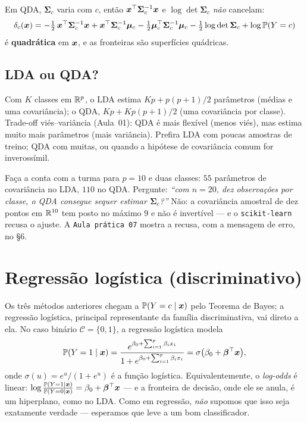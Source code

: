 \documentclass[11pt,a4paper]{article}
\begin{document}
\begin{observacao}
Em QDA, $\bm{\Sigma}_c$ varia com $c$, então $\bm{x}^\top\bm{\Sigma}_c^{-1}\bm{x}$ e
$\log\det\bm{\Sigma}_c$ \emph{não} cancelam:
\[
  \delta_c(\bm{x}) = -\tfrac12\,\bm{x}^\top\bm{\Sigma}_c^{-1}\bm{x}
   + \bm{x}^\top\bm{\Sigma}_c^{-1}\bm{\mu}_c
   - \tfrac12\bm{\mu}_c^\top\bm{\Sigma}_c^{-1}\bm{\mu}_c
   - \tfrac12\log\det\bm{\Sigma}_c + \log\mathbb{P}(Y=c)
\]
é \textbf{quadrática} em $\bm{x}$, e as fronteiras são superfícies quádricas.
\end{observacao}

\subsection{LDA ou QDA?}
Com $K$ classes em $\mathbb{R}^p$, o LDA estima $Kp+p(p+1)/2$ parâmetros (médias e uma
covariância); o QDA, $Kp+Kp(p+1)/2$ (uma covariância por classe). Trade-off
viés--variância (Aula~01): QDA é mais flexível (menos viés), mas estima muito mais
parâmetros (mais variância). Prefira LDA com poucas amostras de treino; QDA com
muitas, ou quando a hipótese de covariância comum for inverossímil.

\begin{emsala}
Faça a conta com a turma para $p=10$ e duas classes: $55$ parâmetros de covariância
no LDA, $110$ no QDA. Pergunte: \emph{``com $n=20$, dez observações por classe, o
QDA consegue sequer estimar $\bm{\Sigma}_c$?''} Não: a covariância amostral de dez
pontos em $\mathbb{R}^{10}$ tem posto no máximo $9$ e não é invertível --- e o
\texttt{scikit-learn} recusa o ajuste. A \texttt{Aula prática 07} mostra a recusa,
com a mensagem de erro, no §6.
\end{emsala}

\section{Regressão logística (discriminativo)}
Os três métodos anteriores chegam a $\mathbb{P}(Y=c\mid\bm{x})$ pelo Teorema de Bayes; a
regressão logística, principal representante da família discriminativa, vai direto a
ela. No caso binário $\mathcal{C}=\{0,1\}$, a regressão logística modela
\begin{equation}\label{eq:logit}
  \mathbb{P}(Y=1\mid\bm{x}) = \frac{e^{\beta_0+\sum_{i=1}^p\beta_i x_i}}
                          {1+e^{\beta_0+\sum_{i=1}^p\beta_i x_i}}
  = \sigma\big(\beta_0+\bm{\beta}^\top\bm{x}\big),
\end{equation}
onde $\sigma(u)=e^u/(1+e^u)$ é a função logística. Equivalentemente, o
\emph{log-odds} é linear: $\log\frac{\mathbb{P}(Y=1\mid\bm{x})}{\mathbb{P}(Y=0\mid\bm{x})}
=\beta_0+\bm{\beta}^\top\bm{x}$ --- e a fronteira de decisão, onde ele se anula, é um
hiperplano, como no LDA. Como em regressão, \emph{não} supomos que isso seja
exatamente verdade --- esperamos que leve a um bom classificador.
\end{document}

